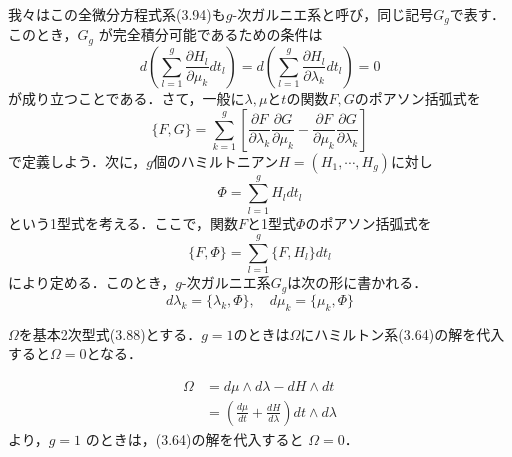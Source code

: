 \documentclass[paper=a4, fontsize=11pt]{jlreq} %
\newenvironment{story}{%
  \begin{mdframed}[
    backgroundcolor=red!5, %
    linewidth=0pt,         %
    innertopmargin=10pt,   %
    innerbottommargin=10pt,
    innerrightmargin=10pt, %
    innerleftmargin=10pt
  ]%
}{%
  \end{mdframed}%
}
\theoremstyle{break}
\theoremstyle{qa}
\begin{document}
\begin{story}

我々はこの全微分方程式系(3.94)も$g$-次ガルニエ系と呼び，同じ記号$G_g$で表す．このとき，$G_g$ が完全積分可能であるための条件は
\begin{equation}
    d\left( \sum_{l=1}^g \frac{\partial H_l}{\partial \mu_k} dt_l \right) = d\left( \sum_{l=1}^g \frac{\partial H_l}{\partial \lambda_k} dt_l \right) = 0 \tag{3.95}
\end{equation}
が成り立つことである．さて，一般に$\lambda, \mu$と$t$の関数$F, G$のポアソン括弧式を
\begin{equation*}
    \{F, G\} = \sum_{k=1}^g \left[ \frac{\partial F}{\partial \lambda_k} \frac{\partial G}{\partial \mu_k} - \frac{\partial F}{\partial \mu_k} \frac{\partial G}{\partial \lambda_k} \right]
\end{equation*}
で定義しよう．次に，$g$個のハミルトニアン$H=(H_1, \cdots, H_g)$に対し
\begin{equation*}
    \Phi = \sum_{l=1}^g H_l dt_l
\end{equation*}
という1型式を考える．ここで，関数$F$と1型式$\Phi$のポアソン括弧式を
\begin{equation*}
    \{F, \Phi\} = \sum_{l=1}^g \{F, H_l\} dt_l
\end{equation*}
により定める．このとき，$g$-次ガルニエ系$G_g$は次の形に書かれる．
\begin{equation*}
    d\lambda_k = \{\lambda_k, \Phi\}, \quad d\mu_k = \{\mu_k, \Phi\}
\end{equation*}

$\Omega$を基本2次型式(3.88)とする．$g=1$のときは$\Omega$にハミルトン系(3.64)の解を代入すると$\Omega=0$となる．
\end{story}
\begin{align*}
    \Omega &= d\mu \wedge d\lambda - dH \wedge dt \\
    &= \left( \frac{d\mu}{dt} + \frac{dH}{d\lambda} \right) dt \wedge d\lambda
\end{align*}
より，$g=1$ のときは，(3.64)の解を代入すると $\Omega = 0$．
\end{document}
